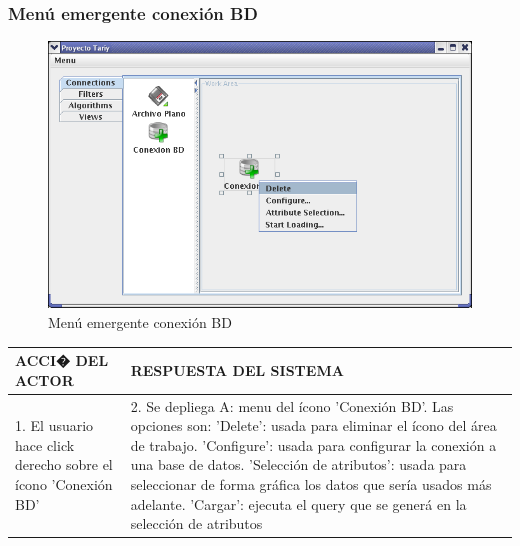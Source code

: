 \subsubsection{Men\'u emergente conexi\'on BD}
\begin{figure}[ht]
\centering
\includegraphics[width=1\textwidth]{images/07.png}
\caption{Men\'u emergente conexi\'on BD}
\end{figure}
\begin{center}
\begin{tabular}{|p{60mm}|p{60mm}|} \hline
ACCI� DEL ACTOR & RESPUESTA DEL SISTEMA \\ \hline
1. El usuario hace click derecho sobre el \'icono 'Conexi\'on BD' & 2. Se depliega A: menu del \'icono 'Conexi\'on BD'. Las opciones son: 'Delete': usada para eliminar el \'icono del \'area de trabajo. 'Configure': usada para configurar la conexi\'on a una base de datos. 'Selecci\'on de atributos': usada para seleccionar de forma gr\'afica los datos que ser\'ia usados m\'as adelante. 'Cargar': ejecuta el query que se gener\'a en la selecci\'on de atributos\\ \hline
\end{tabular}
\end{center}

\newpage
